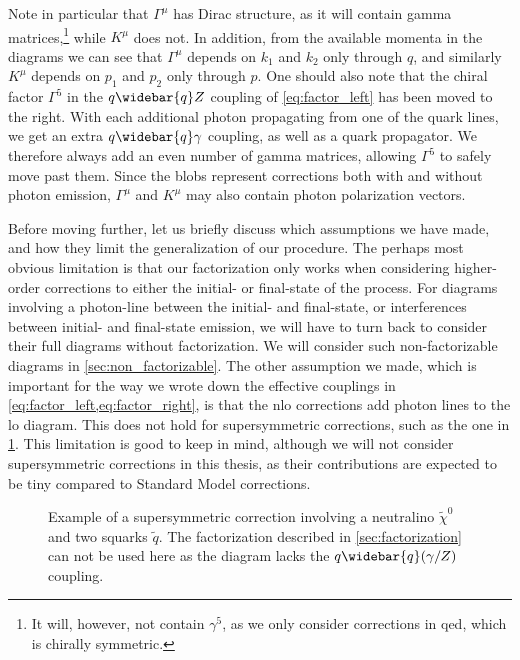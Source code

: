 Note in particular that $\Gamma^\mu$ has Dirac structure, as it will contain gamma matrices,\footnote{It will, however, not contain $\gamma^5$, as we only consider corrections in \gls{qed}, which is chirally symmetric.} while $K^\mu$ does not. In addition, from the available momenta in the diagrams we can see that $\Gamma^\mu$ depends on $k_1$ and $k_2$ only through $q$, and similarly $K^\mu$ depends on $p_1$ and $p_2$ only through $p$.
One should also note that the chiral factor $\Gamma^5$ in the $q\widebar{q}Z$ coupling of \cref{eq:factor_left} has been moved to the right. With each additional photon propagating from one of the quark lines, we get an extra $q\widebar{q}\gamma$ coupling, as well as a quark propagator. We therefore always add an even number of gamma matrices, allowing $\Gamma^5$ to safely move past them.
Since the blobs represent corrections both with and without photon emission, $\Gamma^\mu$ and $K^\mu$ may also contain photon polarization vectors.

Before moving further, let us briefly discuss which assumptions we have made, and how they limit the generalization of our procedure.
The perhaps most obvious limitation is that our factorization only works when considering higher-order corrections to either the initial- or final-state of the process.
For diagrams involving a photon-line between the initial- and final-state, or interferences between initial- and final-state emission, we will have to turn back to consider their full diagrams without factorization. We will consider such non-factorizable diagrams in \cref{sec:non_factorizable}.
The other assumption we made, which is important for the way we wrote down the effective couplings in \cref{eq:factor_left,eq:factor_right}, is that the \gls{nlo} corrections add photon lines to the \gls{lo} diagram. This does not hold for supersymmetric corrections, such as the one in \cref{fig:M_susy}. This limitation is good to keep in mind, although we will not consider supersymmetric corrections in this thesis, as their contributions are expected to be tiny compared to Standard Model corrections.

\begin{figure}
    \centering
    \caption{Example of a supersymmetric correction involving a neutralino $\tilde\chi^0$ and two squarks $\tilde{q}$. The factorization described in \cref{sec:factorization} can not be used here as the diagram lacks the $q\widebar{q}(\gamma/Z)$ coupling.}
    \label{fig:M_susy}
\end{figure}


